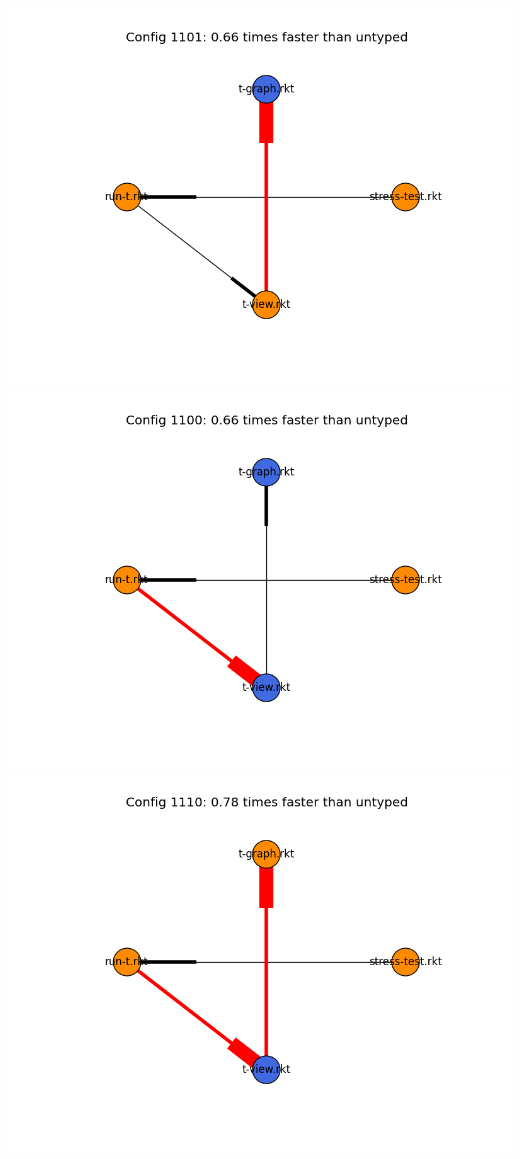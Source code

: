 \documentclass{article}
\begin{document}
\includegraphics[width=\textwidth]{mbta-04-20-asumu-module-graph-1101.png}
\includegraphics[width=\textwidth]{mbta-04-20-asumu-module-graph-1100.png}
\includegraphics[width=\textwidth]{mbta-04-20-asumu-module-graph-1110.png}
\end{document}
